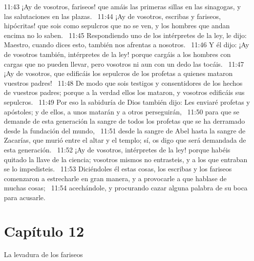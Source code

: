 11:43 ¡Ay de vosotros, fariseos! que amáis las primeras sillas en las sinagogas, y las salutaciones en las plazas.  
11:44 ¡Ay de vosotros, escribas y fariseos, hipócritas! que sois como sepulcros que no se ven, y los hombres que andan encima no lo saben.  
11:45 Respondiendo uno de los intérpretes de la ley, le dijo: Maestro, cuando dices esto, también nos afrentas a nosotros.  
11:46 Y él dijo: ¡Ay de vosotros también, intérpretes de la ley! porque cargáis a los hombres con cargas que no pueden llevar, pero vosotros ni aun con un dedo las tocáis.  
11:47 ¡Ay de vosotros, que edificáis los sepulcros de los profetas a quienes mataron vuestros padres!  
11:48 De modo que sois testigos y consentidores de los hechos de vuestros padres; porque a la verdad ellos los mataron, y vosotros edificáis sus sepulcros.  
11:49 Por eso la sabiduría de Dios también dijo: Les enviaré profetas y apóstoles; y de ellos, a unos matarán y a otros perseguirán,  
11:50 para que se demande de esta generación la sangre de todos los profetas que se ha derramado desde la fundación del mundo,  
11:51 desde la sangre de Abel hasta la sangre de Zacarías, que murió entre el altar y el templo; sí, os digo que será demandada de esta generación.  
11:52 ¡Ay de vosotros, intérpretes de la ley! porque habéis quitado la llave de la ciencia; vosotros mismos no entrasteis, y a los que entraban se lo impedisteis.  
11:53 Diciéndoles él estas cosas, los escribas y los fariseos comenzaron a estrecharle en gran manera, y a provocarle a que hablase de muchas cosas;  
11:54 acechándole, y procurando cazar alguna palabra de su boca para acusarle.  
\section*{Capítulo 12}
La levadura de los fariseos  

